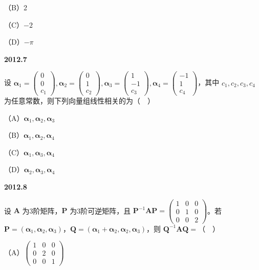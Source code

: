\documentclass[UTF8,12pt,fontset=windows]{ctexart}
\begin{document}
（B）2

（C）$-2$

（D）$-\pi$

\vfill
\newpage
{\large\bfseries 2012.7}

设 $\boldsymbol{\alpha}_1 = \begin{pmatrix} 0 \\ 0 \\ c_1 \end{pmatrix}, \boldsymbol{\alpha}_2 = \begin{pmatrix} 0 \\ 1 \\ c_2 \end{pmatrix}, \boldsymbol{\alpha}_3 = \begin{pmatrix} 1 \\ -1 \\ c_3 \end{pmatrix}, \boldsymbol{\alpha}_4 = \begin{pmatrix} -1 \\ 1 \\ c_4 \end{pmatrix}$，其中 $c_1, c_2, c_3, c_4$ 为任意常数，则下列向量组线性相关的为（　）

（A）$\boldsymbol{\alpha}_1, \boldsymbol{\alpha}_2, \boldsymbol{\alpha}_3$

（B）$\boldsymbol{\alpha}_1, \boldsymbol{\alpha}_2, \boldsymbol{\alpha}_4$

（C）$\boldsymbol{\alpha}_1, \boldsymbol{\alpha}_3, \boldsymbol{\alpha}_4$

（D）$\boldsymbol{\alpha}_2, \boldsymbol{\alpha}_3, \boldsymbol{\alpha}_4$

\vfill
\newpage
{\large\bfseries 2012.8}

设 $\boldsymbol{A}$ 为3阶矩阵，$\boldsymbol{P}$ 为3阶可逆矩阵，且 $\boldsymbol{P}^{-1}\boldsymbol{AP} = \begin{pmatrix} 1 & 0 & 0 \\ 0 & 1 & 0 \\ 0 & 0 & 2 \end{pmatrix}$。若 $\boldsymbol{P} = (\boldsymbol{\alpha}_1, \boldsymbol{\alpha}_2, \boldsymbol{\alpha}_3)$，$\boldsymbol{Q} = (\boldsymbol{\alpha}_1 + \boldsymbol{\alpha}_2, \boldsymbol{\alpha}_2, \boldsymbol{\alpha}_3)$，则 $\boldsymbol{Q}^{-1}\boldsymbol{AQ} =$（　）

（A）$\begin{pmatrix} 1 & 0 & 0 \\ 0 & 2 & 0 \\ 0 & 0 & 1 \end{pmatrix}$
\end{document}
